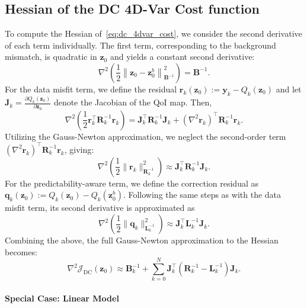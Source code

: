 \documentclass[final,1p,times]{elsarticle}
\begin{document}
\subsection{Hessian of the DC 4D-Var Cost function}
To compute the Hessian of~\eqref{eq:dc_4dvar_cost}, we consider the second derivative of each term individually. 
The first term, corresponding to the background mismatch, is quadratic in $ \mathbf{z}_0 $ and yields a constant second derivative:
\begin{equation}
    \nabla^2\left(\frac{1}{2}\left\|\mathbf{z}_0 - \mathbf{z}_0^b\right\|_{\mathbf{B}^{-1}}^2\right) = \mathbf{B}^{-1}.
\end{equation}
For the data misfit term, we define the residual $ \mathbf{r}_k(\mathbf{z}_0) := \mathbf{y}_k - Q_k(\mathbf{z}_0) $ and let $ \mathbf{J}_k = \frac{\partial Q_k(\mathbf{z}_0)}{\partial \mathbf{z}_0} $ denote the Jacobian of the QoI map. Then, 
\begin{equation}
    \nabla^2\left(\frac{1}{2} \mathbf{r}_k^\top \mathbf{R}_k^{-1} \mathbf{r}_k\right)
    = \mathbf{J}_k^\top \mathbf{R}_k^{-1} \mathbf{J}_k + (\nabla^2 \mathbf{r}_k)^\top \mathbf{R}_k^{-1} \mathbf{r}_k.
\end{equation}
Utilizing the Gauss-Newton approximation, we neglect the second-order term $ (\nabla^2 \mathbf{r}_k)^\top \mathbf{R}_k^{-1} \mathbf{r}_k $, giving:
\begin{equation}
    \nabla^2 \left(\frac{1}{2}\|\mathbf{r}_k\|_{\mathbf{R}_k^{-1}}^2\right) \approx \mathbf{J}_k^\top \mathbf{R}_k^{-1} \mathbf{J}_k.
\end{equation}
For the predictability-aware term, we define the correction residual as $ \mathbf{q}_k(\mathbf{z}_0) := Q_k(\mathbf{z}_0) - Q_k(\mathbf{z}_0^b) $.
Following the same steps as with the data misfit term, its second derivative is approximated as
\begin{equation}
    \nabla^2 \left(\frac{1}{2} \|\mathbf{q}_k\|_{\mathbf{L}_k^{-1}}^2 \right) \approx \mathbf{J}_k^\top \mathbf{L}_k^{-1} \mathbf{J}_k.
\end{equation}
Combining the above, the full Gauss-Newton approximation to the Hessian becomes:
\begin{equation}
    \nabla^2 \mathcal{J}_{\mathrm{DC}}(\mathbf{z}_0) \approx \mathbf{B}_k^{-1}
    + \sum_{k=0}^N \mathbf{J}_k^\top \left( \mathbf{R}_k^{-1} - \mathbf{L}_k^{-1} \right) \mathbf{J}_k.
\end{equation}

\paragraph{Special Case: Linear Model}
\end{document}
